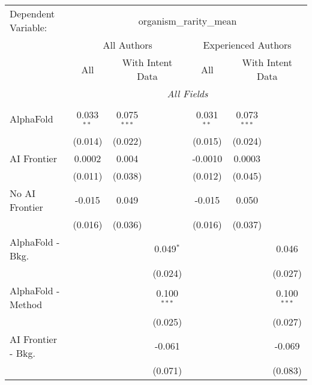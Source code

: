 \begingroup
\centering
\begin{tabular}{lcccccc}
   \tabularnewline \midrule \midrule
   Dependent Variable: & \multicolumn{6}{c}{organism\_rarity\_mean}\\
 & \multicolumn{3}{c}{All Authors} & \multicolumn{3}{c}{Experienced Authors} \\
\cmidrule(lr){2-4} \cmidrule(lr){5-7}
 & \multicolumn{1}{c}{All} & \multicolumn{2}{c}{With Intent Data} & \multicolumn{1}{c}{All} & \multicolumn{2}{c}{With Intent Data} \\
\cmidrule(lr){2-2} \cmidrule(lr){3-4} \cmidrule(lr){5-5} \cmidrule(lr){6-7}
 & \multicolumn{6}{c}{\textit{All Fields}} \\ \\
   AlphaFold               & 0.033$^{**}$ & 0.075$^{***}$ &               & 0.031$^{**}$ & 0.073$^{***}$ &   \\   
                           & (0.014)      & (0.022)       &               & (0.015)      & (0.024)       &   \\   
   AI Frontier             & 0.0002       & 0.004         &               & -0.0010      & 0.0003        &   \\   
                           & (0.011)      & (0.038)       &               & (0.012)      & (0.045)       &   \\   
   No AI Frontier          & -0.015       & 0.049         &               & -0.015       & 0.050         &   \\   
                           & (0.016)      & (0.036)       &               & (0.016)      & (0.037)       &   \\   
   AlphaFold - Bkg.        &              &               & 0.049$^{*}$   &              &               & 0.046\\   
                           &              &               & (0.024)       &              &               & (0.027)\\   
   AlphaFold - Method      &              &               & 0.100$^{***}$ &              &               & 0.100$^{***}$\\   
                           &              &               & (0.025)       &              &               & (0.027)\\   
   AI Frontier - Bkg.      &              &               & -0.061        &              &               & -0.069\\   
                           &              &               & (0.071)       &              &               & (0.083)\\   

\end{tabular}
